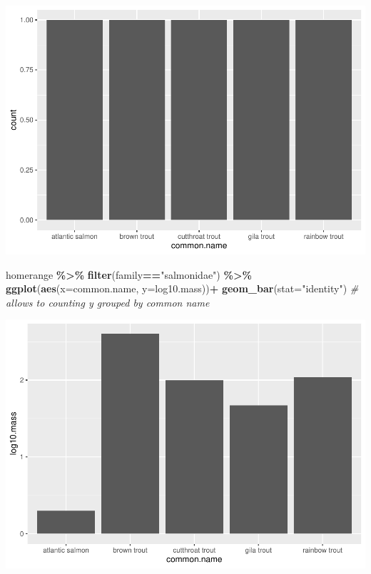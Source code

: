 \documentclass[
]{article}
\newenvironment{Shaded}{\begin{snugshade}}{\end{snugshade}}
\newcommand{\AttributeTok}[1]{\textcolor[rgb]{0.13,0.29,0.53}{#1}}
\newcommand{\CommentTok}[1]{\textcolor[rgb]{0.56,0.35,0.01}{\textit{#1}}}
\newcommand{\FunctionTok}[1]{\textcolor[rgb]{0.13,0.29,0.53}{\textbf{#1}}}
\newcommand{\NormalTok}[1]{#1}
\newcommand{\SpecialCharTok}[1]{\textcolor[rgb]{0.81,0.36,0.00}{\textbf{#1}}}
\newcommand{\StringTok}[1]{\textcolor[rgb]{0.31,0.60,0.02}{#1}}
\begin{document}
\includegraphics{Untitled_files/figure-latex/unnamed-chunk-22-1.pdf}

\begin{Shaded}
\begin{Highlighting}[]
\NormalTok{homerange }\SpecialCharTok{\%\textgreater{}\%} 
  \FunctionTok{filter}\NormalTok{(family}\SpecialCharTok{==}\StringTok{"salmonidae"}\NormalTok{) }\SpecialCharTok{\%\textgreater{}\%} 
  \FunctionTok{ggplot}\NormalTok{(}\FunctionTok{aes}\NormalTok{(}\AttributeTok{x=}\NormalTok{common.name, }\AttributeTok{y=}\NormalTok{log10.mass))}\SpecialCharTok{+} 
  \FunctionTok{geom\_bar}\NormalTok{(}\AttributeTok{stat=}\StringTok{"identity"}\NormalTok{) }\CommentTok{\# allows to counting y grouped by common name}
\end{Highlighting}
\end{Shaded}

\includegraphics{Untitled_files/figure-latex/unnamed-chunk-23-1.pdf}
\end{document}
